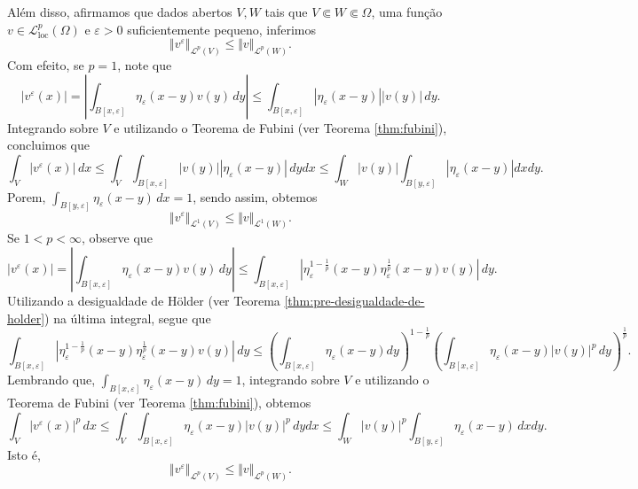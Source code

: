\documentclass[a4paper, 11pt]{book}
\theoremstyle{definition}
\newcommand{\cL}{\mathcal{L}}
\newcommand{\loc}{\mathrm{loc}}
\begin{document}
\begin{prf}
    Além disso, afirmamos que dados abertos $V, W$ tais que $V \Subset W \Subset \Omega$, uma função $v \in \cL^p_\loc(\Omega)$ e $\varepsilon > 0$ suficientemente pequeno, inferimos
    \begin{equation} \label{eq:assss}
        \Vert v^\varepsilon \Vert_{\cL^p(V)} \leqslant \Vert v \Vert_{\cL^p(W)}.
    \end{equation}
    Com efeito, se $p = 1$, note que
    \[
        |v^\varepsilon(x)| =  \left| \int_{B[x,\varepsilon]} \eta_\varepsilon (x-y) v(y) \,dy \right| \leqslant \int_{B[x,\varepsilon]} |\eta_\varepsilon(x-y)| | v(y)| \,dy.
    \]
    Integrando sobre $V$ e utilizando o Teorema de Fubini (ver Teorema \ref{thm:fubini}), concluimos que
    \[
        \int_V |v^\varepsilon(x)| \,dx \leqslant \int_V  \int_{B[x,\varepsilon]} |v(y)||\eta_\varepsilon(x-y)| \, dydx \leqslant \int_W |v(y)| \int_{B[y,\varepsilon]} |\eta_\varepsilon (x-y)| dxdy.
    \]
    Porem, $\int_{B[y,\varepsilon]} \eta_\varepsilon(x- y) \,dx = 1$, sendo assim, obtemos
    \[
        \Vert v^\varepsilon \Vert_{\cL^1(V)} \leqslant \Vert v \Vert_{\cL^1(W)}.
    \]
    Se $1 < p < \infty$, observe que
    \[
        |v^\varepsilon(x)| = \left| \int_{B[x,\varepsilon]} \eta_\varepsilon(x-y) v(y) \,dy \right| \leqslant \int_{B[x,\varepsilon]} \left| \eta_\varepsilon^{1 - \frac{1}{p}} (x-y) \eta_\varepsilon^{\frac{1}{p}} (x-y) v(y) \right| \,dy.
    \]
    Utilizando a desigualdade de Hölder (ver Teorema \ref{thm:pre-desigualdade-de-holder}) na última integral, segue que
    {\small
        \[
            \int_{B[x,\varepsilon]} \left| \eta_\varepsilon^{1 - \frac{1}{p}} (x-y) \eta_\varepsilon^{\frac{1}{p}} (x-y) v(y) \right| \,dy \leqslant \left( \int_{B[x,\varepsilon]} \eta_\varepsilon(x-y) dy \right)^{1 - \frac{1}{p}} \left( \int_{B[x,\varepsilon]} \eta_\varepsilon(x-y) |v(y)|^p \,dy \right)^{\frac{1}{p}}.
        \]
    }\!
    Lembrando que, $\int_{B[x,\varepsilon]} \eta_\varepsilon(x-y) \,dy = 1$, integrando sobre $V$ e utilizando o Teorema de Fubini (ver Teorema \ref{thm:fubini}), obtemos
    \[
        \int_V |v^\varepsilon(x)|^p \,dx \leqslant \int_V \int_{B[x,\varepsilon]} \eta_\varepsilon(x-y) |v(y)|^p \,dy dx \leqslant \int_W |v(y)|^p \int_{B[y,\varepsilon]} \eta_\varepsilon(x-y) \,dxdy.
    \]
    Isto é,
    \begin{equation*}
        \Vert v^\varepsilon \Vert_{\cL^p(V)} \leqslant \Vert v \Vert_{\cL^p(W)}.
    \end{equation*}


\end{prf}
\end{document}
